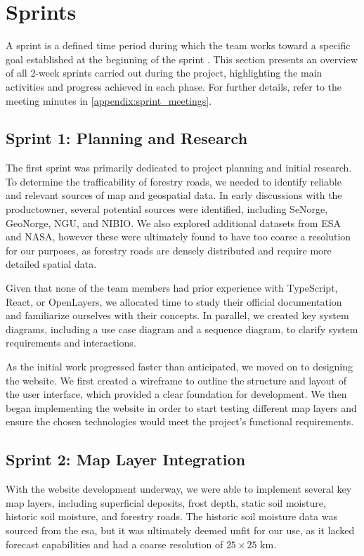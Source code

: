 \section{Sprints}
A sprint is a defined time period during which the team works toward a specific goal established at the beginning of the sprint \cite{scrum_guide}. This section presents an overview of all 2-week sprints carried out during the project, highlighting the main activities and progress achieved in each phase. For further details, refer to the meeting minutes in \autoref{appendix:sprint_meetings}.

\subsection*{Sprint 1: Planning and Research}

The first sprint was primarily dedicated to project planning and initial research.  To determine the trafficability of forestry roads, we needed to identify reliable and relevant sources of map and geospatial data. In early discussions with the \gls{productowner}, several potential sources were identified, including SeNorge, GeoNorge, NGU, and NIBIO. We also explored additional datasets from ESA and NASA, however these were ultimately found to have too coarse a resolution for our purposes, as forestry roads are densely distributed and require more detailed spatial data.

Given that none of the team members had prior experience with TypeScript, React, or OpenLayers, we allocated time to study their official documentation and familiarize ourselves with their concepts. In parallel, we created key system diagrams, including a use case diagram and a sequence diagram, to clarify system requirements and interactions. 

As the initial work progressed faster than anticipated, we moved on to designing the website. We first created a wireframe to outline the structure and layout of the user interface, which provided a clear foundation for development. We then began implementing the website in order to start testing different map layers and ensure the chosen technologies would meet the project's functional requirements.

\subsection*{Sprint 2: Map Layer Integration}

With the website development underway, we were able to implement several key map layers, including superficial deposits, frost depth, static soil moisture, historic soil moisture, and forestry roads. The historic soil moisture data was sourced from the \acrshort{esa}, but it was ultimately deemed unfit for our use, as it lacked forecast capabilities and had a coarse resolution of $25 \times 25\text{ km}$.

